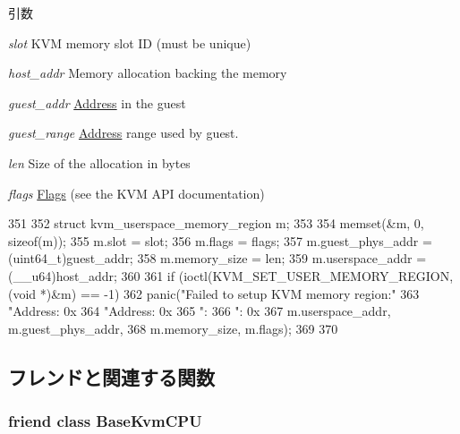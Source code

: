 \begin{DoxyParams}{引数}
\item[{\em slot}]KVM memory slot ID (must be unique) \item[{\em host\_\-addr}]Memory allocation backing the memory \item[{\em guest\_\-addr}]\hyperlink{classAddress}{Address} in the guest \item[{\em guest\_\-range}]\hyperlink{classAddress}{Address} range used by guest. \item[{\em len}]Size of the allocation in bytes \item[{\em flags}]\hyperlink{classFlags}{Flags} (see the KVM API documentation) \end{DoxyParams}



\begin{DoxyCode}
351 {
352     struct kvm_userspace_memory_region m;
353 
354     memset(&m, 0, sizeof(m));
355     m.slot = slot;
356     m.flags = flags;
357     m.guest_phys_addr = (uint64_t)guest_addr;
358     m.memory_size = len;
359     m.userspace_addr = (__u64)host_addr;
360 
361     if (ioctl(KVM_SET_USER_MEMORY_REGION, (void *)&m) == -1) {
362         panic("Failed to setup KVM memory region:\n"
363               "\tHost Address: 0x%
364               "\tGuest Address: 0x%
365               "\tSize: %
366               "\tFlags: 0x%
367               m.userspace_addr, m.guest_phys_addr,
368               m.memory_size, m.flags);
369     }
370 }
\end{DoxyCode}


\subsection{フレンドと関連する関数}
\hypertarget{classKvmVM_a61d1fc6581a443ce7c1106a1b6922d40}{
\subsubsection[{BaseKvmCPU}]{\setlength{\rightskip}{0pt plus 5cm}friend class {\bf BaseKvmCPU}}}
\label{classKvmVM_a61d1fc6581a443ce7c1106a1b6922d40}


